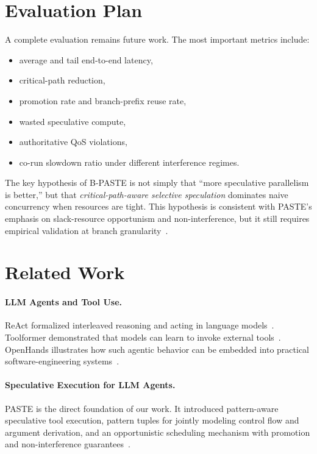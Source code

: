 \documentclass[10pt,twocolumn]{article}
\begin{document}
\section{Evaluation Plan}

A complete evaluation remains future work. The most important metrics include:
\begin{itemize}[leftmargin=1.5em]
    \item average and tail end-to-end latency,
    \item critical-path reduction,
    \item promotion rate and branch-prefix reuse rate,
    \item wasted speculative compute,
    \item authoritative QoS violations,
    \item co-run slowdown ratio under different interference regimes.
\end{itemize}

The key hypothesis of B-PASTE is not simply that ``more speculative parallelism is better,'' but that \emph{critical-path-aware selective speculation} dominates naive concurrency when resources are tight. This hypothesis is consistent with PASTE's emphasis on slack-resource opportunism and non-interference, but it still requires empirical validation at branch granularity~\cite{paste}.

\section{Related Work}

\paragraph{LLM Agents and Tool Use.}
ReAct formalized interleaved reasoning and acting in language models~\cite{react}. Toolformer demonstrated that models can learn to invoke external tools~\cite{toolformer}. OpenHands illustrates how such agentic behavior can be embedded into practical software-engineering systems~\cite{openhands}.

\paragraph{Speculative Execution for LLM Agents.}
PASTE is the direct foundation of our work. It introduced pattern-aware speculative tool execution, pattern tuples for jointly modeling control flow and argument derivation, and an opportunistic scheduling mechanism with promotion and non-interference guarantees~\cite{paste}.
\end{document}
